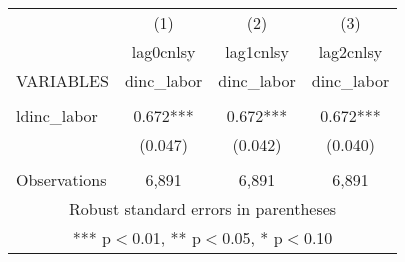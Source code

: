 \begin{tabular}{lccc} \hline
 & (1) & (2) & (3) \\
 & lag0cnlsy & lag1cnlsy & lag2cnlsy \\
VARIABLES & dinc\_labor & dinc\_labor & dinc\_labor \\ \hline
 &  &  &  \\
ldinc\_labor & 0.672*** & 0.672*** & 0.672*** \\
 & (0.047) & (0.042) & (0.040) \\
 &  &  &  \\
 Observations & 6,891 & 6,891 & 6,891 \\ \hline
\multicolumn{4}{c}{ Robust standard errors in parentheses} \\
\multicolumn{4}{c}{ *** p$<$0.01, ** p$<$0.05, * p$<$0.10} \\
\end{tabular}
